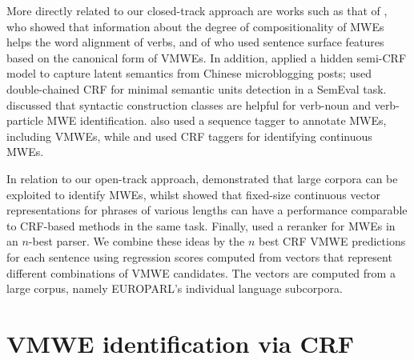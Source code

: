\documentclass[output=paper,modfonts,nonflat]{langsci/langscibook}
\begin{document}
More directly related to our closed-track approach are works such as that of  \cite{Venkatapathy:2006:UIM:1613692.1613697}, who showed that information about the degree of compositionality of MWEs helps the word alignment of verbs, and of \cite{BoukobzaR09} who used sentence surface features based on the canonical form of VMWEs. In addition, \cite{conf/ialp/SunLTR13} applied a hidden semi-CRF model to capture latent semantics from Chinese microblogging posts; \cite{DBLP:conf/semeval/HosseiniSL16} used double-chained CRF for minimal semantic units detection in a SemEval task. \cite{Bar2014} discussed that syntactic construction classes are helpful for verb-noun{} and verb-particle MWE identification. \cite{Schneider14b} also used a sequence tagger to annotate MWEs, including VMWEs, while \cite{blunsom-baldwin:2006:EMNLP} and \cite{wiki50} used CRF taggers for identifying continuous MWEs. 

In relation to our open-track approach, \cite{attia2010automatic} demonstrated that large corpora can be exploited to identify MWEs, whilst \cite{legrand2016phrase} showed that fixed-size continuous vector representations for phrases of various lengths can have a performance comparable to CRF-based methods in the same task. Finally, \cite{Constant2012} used a reranker for MWEs in an $n$-best parser. We combine these ideas by  the $n$ best CRF VMWE predictions for each sentence using regression scores computed from vectors that represent different combinations of VMWE candidates. The vectors are computed from a large corpus, namely EUROPARL's individual language subcorpora.  %


\section{\label{subsec:CRF}VMWE identification via CRF}
\end{document}
